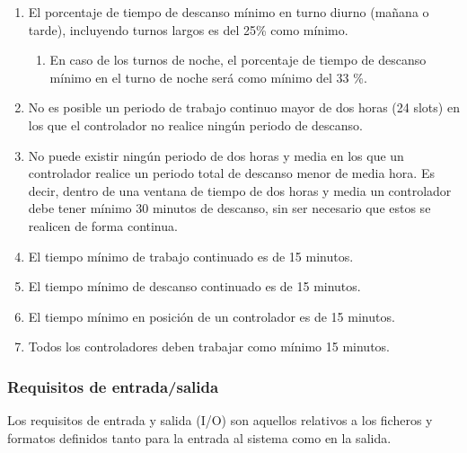 \begin{enumerate}[resume*]
	
	\item \label{RD:3:porcentaje-min-descanso} El porcentaje de tiempo de descanso mínimo en turno diurno (mañana o tarde), incluyendo turnos largos es del 25\% como mínimo.
	\begin{enumerate}[label*={\textbf{.\arabic*}}]
		\item En caso de los turnos de noche, el porcentaje de tiempo de descanso mínimo en el turno de noche será
		como mínimo del 33 \%.
	\end{enumerate}
	
	\item \label{R:5:max-trabajo-continuado} No es posible un periodo de trabajo continuo mayor de dos horas (24 slots) en los que el controlador no realice ningún periodo de descanso.
	
	\item No puede existir ningún periodo de dos horas y media en los que un controlador realice un periodo total de descanso menor de media hora. Es decir, dentro de una ventana de tiempo de dos horas y media un controlador debe tener mínimo 30 minutos de descanso, sin ser necesario que estos se realicen de forma continua.
	
	\item \label{RD:9:tiempo-min-trabajo-continuado} El tiempo mínimo de trabajo continuado es de 15 minutos.
	
	\item \label{RD:9:tiempo-min-descanso-continuado} El tiempo mínimo de descanso continuado es de 15 minutos.
	
	\item El tiempo mínimo en posición de un controlador es de 15 minutos.
	
	\item Todos los controladores deben trabajar como mínimo 15 minutos.
	
\end{enumerate}


\subsubsection{Requisitos de entrada/salida} \label{sec:4:req-io}
Los requisitos de entrada y salida (I/O) son aquellos relativos a los ficheros y formatos definidos tanto para la entrada al sistema como en la salida.

